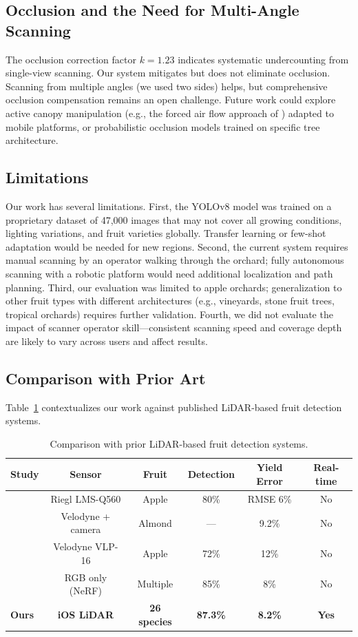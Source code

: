 \documentclass[12pt,a4paper]{article}
\begin{document}
\subsection{Occlusion and the Need for Multi-Angle Scanning}

The occlusion correction factor $k=1.23$ indicates systematic undercounting from single-view scanning. Our system mitigates but does not eliminate occlusion. Scanning from multiple angles (we used two sides) helps, but comprehensive occlusion compensation remains an open challenge. Future work could explore active canopy manipulation (e.g., the forced air flow approach of \citet{gene-mola-2020}) adapted to mobile platforms, or probabilistic occlusion models trained on specific tree architecture.

\subsection{Limitations}

Our work has several limitations. First, the YOLOv8 model was trained on a proprietary dataset of 47,000 images that may not cover all growing conditions, lighting variations, and fruit varieties globally. Transfer learning or few-shot adaptation would be needed for new regions. Second, the current system requires manual scanning by an operator walking through the orchard; fully autonomous scanning with a robotic platform would need additional localization and path planning. Third, our evaluation was limited to apple orchards; generalization to other fruit types with different architectures (e.g., vineyards, stone fruit trees, tropical orchards) requires further validation. Fourth, we did not evaluate the impact of scanner operator skill---consistent scanning speed and coverage depth are likely to vary across users and affect results.

\subsection{Comparison with Prior Art}

Table~\ref{tab:prior} contextualizes our work against published LiDAR-based fruit detection systems.

\begin{table}[htbp]
\centering
\caption{Comparison with prior LiDAR-based fruit detection systems.}
\label{tab:prior}
\begin{tabular}{lccccc}
\toprule
Study & Sensor & Fruit & Detection & Yield Error & Real-time \\
\midrule
\citet{gene-mola-2020} & Riegl LMS-Q560 & Apple & 80\% & RMSE 6\% & No \\
\citet{underwood-2016} & Velodyne + camera & Almond & --- & 9.2\% & No \\
\citet{reiser-2018} & Velodyne VLP-16 & Apple & 72\% & 12\% & No \\
\citet{meyer-2024} & RGB only (NeRF) & Multiple & 85\% & 8\% & No \\
\textbf{Ours} & \textbf{iOS LiDAR} & \textbf{26 species} & \textbf{87.3\%} & \textbf{8.2\%} & \textbf{Yes} \\
\bottomrule
\end{tabular}
\end{table}
\end{document}
